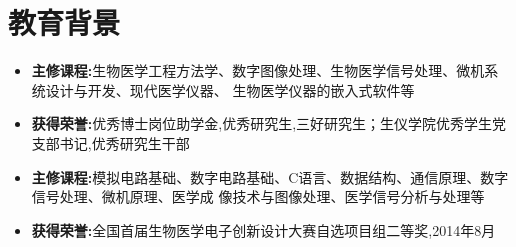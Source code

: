 \documentclass{resume}
\begin{document}
\section{教育背景}
\begin{itemize}
    \item \textbf{主修课程:}生物医学工程方法学、数字图像处理、生物医学信号处理、微机系统设计与开发、现代医学仪器、
    生物医学仪器的嵌入式软件等
    \item \textbf{获得荣誉:}优秀博士岗位助学金,优秀研究生,三好研究生；生仪学院优秀学生党支部书记,优秀研究生干部
\end{itemize}
\begin{itemize}
    \item \textbf{主修课程:}模拟电路基础、数字电路基础、C语言、数据结构、通信原理、数字信号处理、微机原理、医学成
    像技术与图像处理、医学信号分析与处理等
    \item \textbf{获得荣誉:}全国首届生物医学电子创新设计大赛自选项目组二等奖,2014年8月
\end{itemize}
\end{document}
